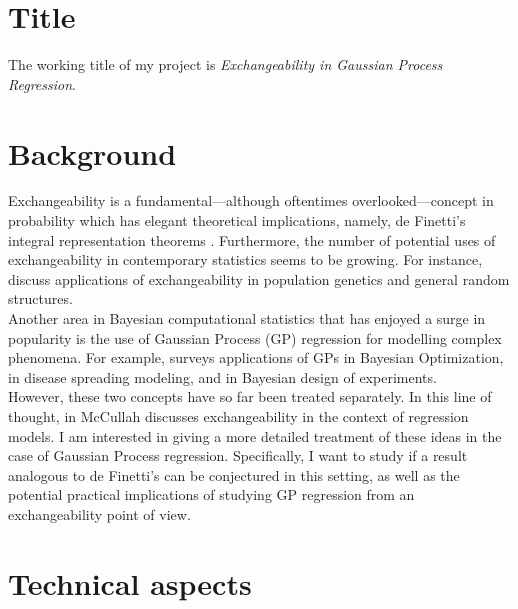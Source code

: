 \documentclass[]{STAT_547C}
\begin{document}
\vspace{-2cm}


\section{Title}

The working title of my project is \emph{Exchangeability in Gaussian Process Regression}.  

\section{Background}


Exchangeability is a fundamental---although oftentimes overlooked---concept in probability which has elegant theoretical implications, namely, de Finetti's integral representation theorems \cite{deFinetti:1930:RepTheorem}. Furthermore, the number of potential uses of exchangeability in contemporary statistics seems to be growing. For instance, \cite{Kingman:1978, Aldous:2010, Orbanz:Roy:2015} discuss applications of exchangeability in population genetics and general random structures. \\

Another area in Bayesian computational statistics that has enjoyed a surge in popularity is the use of Gaussian Process (GP) regression for modelling complex phenomena. For example, \cite{Frazier:2018:BayesOptTutorial} surveys applications of GPs in Bayesian Optimization, \cite{PokharelDeardon:2016:GPInfectDisease} in disease spreading modeling, and \cite{WoodsEtAl:2017:ACEAlgorithm} in Bayesian design of experiments. \\

However, these two concepts have so far been treated separately. In this line of thought, in \cite{McCullagh:2005:ExchAndReg} McCullah discusses exchangeability in the context of regression models. I am interested in giving a more detailed treatment of these ideas in the case of Gaussian Process regression. Specifically, I want to study if a result analogous to de Finetti's can be conjectured in this setting, as well as the potential practical implications of studying GP regression from an exchangeability point of view.



\section{Technical aspects}
\end{document}
